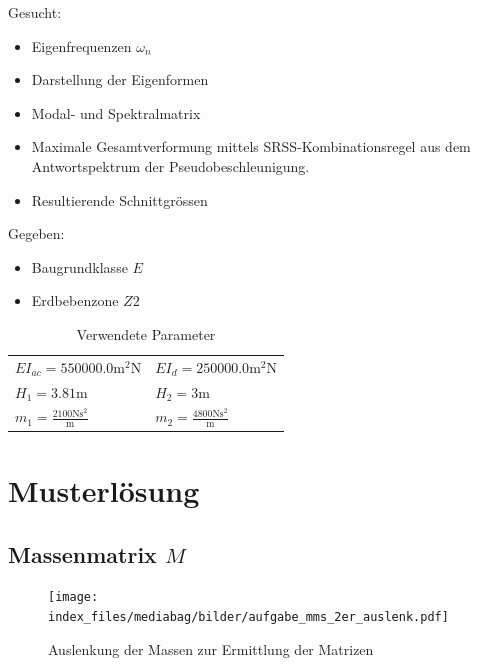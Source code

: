 \documentclass[
  letterpaper,
  DIV=11]{scrreprt}
\providecommand{\tightlist}{%
  \setlength{\itemsep}{0pt}\setlength{\parskip}{0pt}}\usepackage{longtable,booktabs,array}
\begin{document}
Gesucht:

\begin{itemize}
\tightlist
\item
  Eigenfrequenzen \(\omega_n\)
\item
  Darstellung der Eigenformen
\item
  Modal- und Spektralmatrix
\item
  Maximale Gesamtverformung mittels SRSS-Kombinationsregel aus dem
  Antwortspektrum der Pseudobeschleunigung.
\item
  Resultierende Schnittgrössen
\end{itemize}

Gegeben:

\begin{itemize}
\tightlist
\item
  Baugrundklasse \(E\)
\item
  Erdbebenzone \(Z2\)
\end{itemize}

\hypertarget{tbl-parameter_mms6}{}
\begin{longtable}[]{@{}
  >{\raggedright\arraybackslash}p{}
  >{\raggedright\arraybackslash}p{}@{}}
\caption{\label{tbl-parameter_mms6}Verwendete Parameter}\tabularnewline
\toprule\noalign{}
\endfirsthead
\endhead
\bottomrule\noalign{}
\endlastfoot
\(EI_{ac} = 550000.0 \text{m}^{2} \text{N}\) &
\(EI_{d} = 250000.0 \text{m}^{2} \text{N}\) \\
\(H_{1} = 3.81 \text{m}\) & \(H_{2} = 3 \text{m}\) \\
\(m_{1} = \frac{2100 \text{N} \text{s}^{2}}{\text{m}}\) &
\(m_{2} = \frac{4800 \text{N} \text{s}^{2}}{\text{m}}\) \\
\end{longtable}

\newpage{}

\hypertarget{musterluxf6sung-12}{%
\section{Musterlösung}\label{musterluxf6sung-12}}

\hypertarget{massenmatrix-m-1}{%
\subsection{\texorpdfstring{Massenmatrix
\(M\)}{Massenmatrix M}}\label{massenmatrix-m-1}}

\begin{figure}[H]

{\centering \texttt{[image: index\_files/mediabag/bilder/aufgabe\_mms\_2er\_auslenk.pdf]}

}

\caption{\label{fig-mms_2er_steifigkeit}Auslenkung der Massen zur
Ermittlung der Matrizen}

\end{figure}
\end{document}
